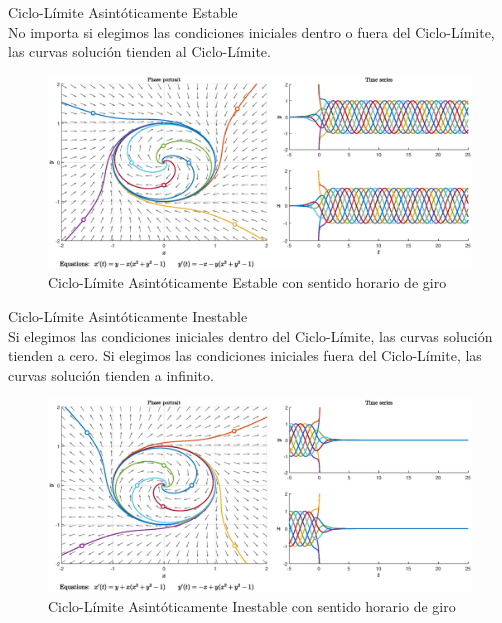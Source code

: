 \documentclass[12pt,a4paper]{report} %
\begin{document}
		{\Large\textbullet\quad Ciclo-Límite Asintóticamente Estable}\\[0.5cm]
		
		No importa si elegimos las condiciones iniciales dentro o fuera del Ciclo-Límite, las curvas solución tienden al Ciclo-Límite.
		
		\begin{figure}[h]
			\centering
			\includegraphics[width=1\textwidth]{cle.eps}
			\caption{Ciclo-Límite Asintóticamente Estable con sentido horario de giro}
			\label{fig:cle}
		\end{figure}\smallskip

	\newpage
		
	{\Large\textbullet\quad Ciclo-Límite Asintóticamente Inestable}\\[0.5cm]
	
	Si elegimos las condiciones iniciales dentro del Ciclo-Límite, las curvas solución tienden a cero. Si elegimos las condiciones iniciales fuera del Ciclo-Límite, las curvas solución tienden a infinito.
	
	\begin{figure}[h]
		\centering
		\includegraphics[width=1\textwidth]{cli.eps}
		\caption{Ciclo-Límite Asintóticamente Inestable con sentido horario de giro}
		\label{fig:cli}
	\end{figure}\smallskip
	
\end{document}
